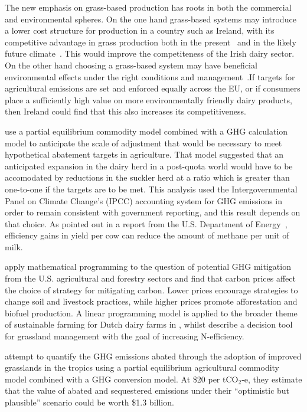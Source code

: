 \documentclass[12pt]{report}
\begin{document}
The new emphasis on grass-based production has roots in both the commercial and environmental spheres. On the one hand grass-based systems may introduce a lower cost structure for production in a country such as Ireland, with its competitive advantage in grass production both in the present~\citep{jesse07} and in the likely future climate~\citep{fitzgerald09}. This would improve the competiteness of the Irish dairy sector. On the other hand choosing a grass-based system may have beneficial environmental effects under the right conditions and management~\citep{kristensen05}.If targets for agricultural emissions are set and enforced equally across the EU, or if consumers place a sufficiently high value on more environmentally friendly dairy products, then Ireland could find that this also increases its competitiveness.  

\citet{donnellan09a} use a partial equilibrium commodity model combined with a GHG calculation model to anticipate the scale of adjustment that would be necessary to meet hypothetical abatement targets in agriculture. That model suggested that an anticipated expansion in the dairy herd in a post-quota world would have to be accomodated by reductions in the suckler herd at a ratio which is greater than one-to-one if the targets are to be met. This analysis used the Intergovernmental Panel on Climate Change's (IPCC) accounting system for GHG emissions in order to remain consistent with government reporting, and this result depends on that choice. As pointed out in a report from the U.S. Department of Energy~\citep{doe99}, efficiency gains in yield per cow can reduce the amount of methane per unit of milk. 

\cite{schneider02} apply mathematical programming to the question of potential GHG mitigation from the U.S. agricultural and forestry sectors and find that carbon prices affect the choice of strategy for mitigating carbon. Lower prices encourage strategies to change soil and livestock practices, while higher prices promote afforestation and biofuel production. A linear programming model is applied to the broader theme of sustainable farming for Dutch dairy farms in \citet{vancalker04}, whilst \citet{brown05} describe a decision tool for grassland management with the goal of increasing N-efficiency.

\citet{thornton10} attempt to quantify the GHG emissions abated through the adoption of improved grasslands in the tropics using a partial equilibrium agricultural commodity model combined with a GHG conversion model. At \$20 per tCO$_2$-e, they estimate that the value of abated and sequestered emissions under their ``optimistic but plausible'' scenario could be worth \$1.3 billion.
\end{document}
